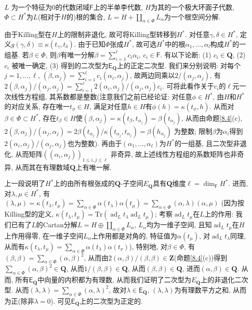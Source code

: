 \documentclass{ctexart}%
\theoremstyle{definition}
\theoremstyle{remark}
\DeclareMathOperator{\ad}{ad}
\begin{document}
$L$ 为一个特征为0的代数闭域$\mathsf{F}$上的半单李代数, $H$为其的一个极大环面子代数, $\Phi\subset H^*$为$L$(相对于$H$的)根的集合, $L=H+\coprod_{\alpha\in \Phi}L_\alpha$为一个根空间分解.

由于Killing型在$H$上的限制非退化, 故可将Killing型转移到$H^*$. 对任意$\gamma,\delta\in H^*$, 定义$g(\gamma,\delta)\equiv \kappa(t_\gamma,t_\delta)$. 由于已知$\Phi$张成$H^*$, 故可选$H^*$中的根$\alpha_1,...,\alpha_l$构成$H^*$的一组基. 若$\beta\in \Phi$, 则$\beta$有唯一分解$\beta=\sum_{i=1}^\ell c_i\alpha_i$, $c_i\in\mathsf{F}$. 有以下论断: (1) $c_i\in \mathbf{Q}$, (2)$c_i$ 被唯一确定, (3) 得到的二次型为$\mathsf{E}_{\mathbf{Q}}$上的正定二次型. 我们来分别说明: 对每个$j=1,...,\ell$, $(\beta,\alpha_j) = \sum_{i=1}^\ell c_i(\alpha_i,\alpha_j)$, 故两边同乘以$2/(\alpha_j,\alpha_j)$, 有$2(\beta,\alpha_j)/(\alpha_j,\alpha_j) = \sum_{i=1}^\ell 2(\alpha_i,\alpha_j)/(\alpha_j,\alpha_j) c_i$. 可将此看作关于$c_i$的$\ell$元一次线性方程组, 其系数都是整数(注意我们之前已经论证: 对任意$\phi \in H^*$, 由$H$和$H^*$的对应关系, 存在唯一$t_\phi \in H$, 满足对任意$h\in H$有$\phi(h) = \kappa(t_\phi,h)$. 从而对$\beta\in \Phi\subset H^*$, 存在$t_\beta \in H$使$(\beta,\alpha_j) = \kappa(t_\beta,t_{\alpha_j})=\beta(t_{\alpha_j})$, 从而由命题\ref{8.4}(c), $2(\beta,\alpha_j)/(\alpha_j,\alpha_j)=2\beta(t_{\alpha_j})/\kappa(t_{\alpha_j},t_{\alpha_j}) = \beta(h_{\alpha_j})$ 为整数; 限制$\beta$为$\alpha_i$得到$2(\alpha_i,\alpha_j)/(\alpha_j,\alpha_j)$也为整数). 再由于$(\alpha_1,...,\alpha_\ell)$为$H^*$的一组基, 且二次型非退化, 从而矩阵$((\alpha_i,\alpha_j))_{1\leq i,j\leq \ell}$ 非奇异, 故上述线性方程组的系数矩阵也非奇异, 从而其在有理数域$\mathbf{Q}$上有唯一解.

上一段说明了$H^*$上的由所有根张成的$\mathbf{Q}$-子空间$E_{\mathbf{Q}}$具有$\mathbf{Q}$维度$\ell = \dim_{\mathsf{F}} H^*$. 进而, 对$\lambda,\mu \in H^*$, 有$(\lambda,\mu)=\kappa(t_\lambda,t_\mu)=\sum_{\alpha\in \Phi} \alpha(t_\lambda)\alpha(t_\mu) = \sum_{\alpha\in \Phi}(\alpha,\lambda)(\alpha,\mu)$ (因为按Killing型的定义, $\kappa(t_\lambda,t_\mu) = \mathrm{Tr}(\ad_L {t_\lambda}\ad_L {t_\mu})$; 考察$\ad_L t_\mu$在$L$上的作用: 我们已有了$L$的Cartan分解$L=H\oplus \coprod_{\alpha \in \Phi} L_\alpha$, $L_\alpha$均为一维子空间, 且知$\ad_L t_\mu$在$H$上作用得零, 在一维子空间$L_\alpha$上作用都是对角的, 特征值为$\alpha(t_\mu)$, 对$\ad_L t_\lambda$同理, 从而有$\kappa(t_\lambda,t_\mu) = \sum_{\alpha \in \Phi} \alpha(t_\lambda) \alpha (t_\nu)$), 特别地, 对$\beta\in \Phi$, 有$(\beta,\beta) =\sum_{\alpha\in\Phi}(\alpha,\beta)^2$, 从而由$2(\alpha,\beta)/(\beta,\beta)\in\mathbf{Z}$(命题\ref{8.4}(c))得到$\sum_{\alpha\in\Phi}(\alpha,\beta)^2\in\mathbf{Q}$, 从而$1/(\beta,\beta)\in\mathbf{Q}$, 从而$(\beta,\beta)\in\mathbf{Q}$, 进而$(\alpha,\beta)\in\mathbf{Q}$. 从而, 所有$\mathsf{E}_{\mathbf{Q}}$中向量的内积都为有理数, 从而我们证明了二次型为$E_{\mathbf{Q}}$上的非退化二次型. 从而$(\lambda,\lambda)=\sum_{\alpha\in\Phi}(\alpha,\lambda)^2$, 故对$\lambda \in\mathsf{E}_{\mathbf{Q}}$, $(\lambda,\lambda)$为有理数平方之和, 从而为正(除非$\lambda=0$). 可见$\mathsf{E}_{\mathbf{Q}}$上的二次型为正定的.
\end{document}
